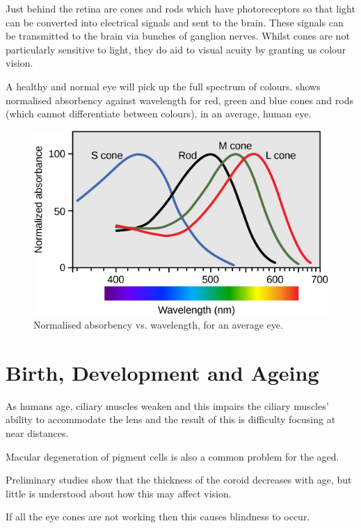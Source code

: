 Just behind the retina are cones and rods which have photoreceptors so
that light can be converted into electrical signals and sent to the brain.
These signals can be transmitted to the brain via bunches of ganglion nerves.
Whilst cones are not particularly sensitive to light, they do aid to visual
acuity by granting us colour vision.\cite{}

A healthy and normal eye will pick up the full spectrum of colours.
 shows normalised absorbency against wavelength
for red, green and blue cones and rods (which cannot differentiate between
colours), in an average, human eye.

\begin{figure}[htbp]
  \centering
    \includegraphics{figures/wavelengths}
  \caption{Normalised absorbency vs. wavelength, for an average eye.}
  \label{fig:wavelengths}
\end{figure}

\section{Birth, Development and Ageing}

As humans age, ciliary muscles weaken and this impairs the ciliary
muscles' ability to accommodate the lens and the result of this is
difficulty focusing at near distances.\cite{fisher1985ciliary}

Macular degeneration of pigment cells  is
also a common problem for the aged.

Preliminary studies show that the thickness of the coroid decreases
with age, but little is understood about how this may affect vision.
\cite{margolis2009pilot}

If all the eye cones are not working then this causes blindness
to occur.\cite{}